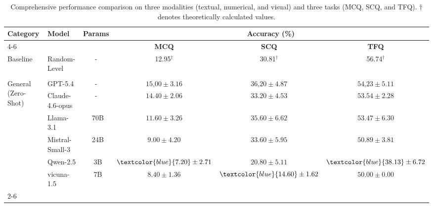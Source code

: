 \begin{table}[t]
    \centering
    \caption{Comprehensive performance comparison on three modalities (textual, numerical, and visual) and three tasks (MCQ, SCQ, and TFQ). $\dagger$ denotes theoretically calculated values. }
    \vspace{-2mm}
    \label{tab:main_results_hierarchical}
    \renewcommand{\arraystretch}{1.0} 
    \setlength{\tabcolsep}{14pt} %
    \begin{tabular}{@{} l l c c c c @{}}
        \toprule
        \multirow{2}{*}{\textbf{Category}} & \multirow{2}{*}{\textbf{Model}} & \multirow{2}{*}{\textbf{Params}} & \multicolumn{3}{c}{\textbf{Accuracy (\%)}} \\
        \cmidrule(lr){4-6} 
        & & & \textbf{MCQ} & \textbf{SCQ} & \textbf{TFQ} \\
        \midrule
        
        Baseline & Random-Level & - & 12.95$^\dagger$ & 30.81$^\dagger$ & 56.74$^\dagger$ \\
        \midrule
        
        \rowcolor{blue!10} \multicolumn{6}{c}{\textit{Textual Modality}} \\
        \midrule

        \multirow{6}{*}{General (Zero-Shot)} 
         &  GPT-5.4 \cite{singh2025openai} & - & $\underline{15.00} \pm 3.16$ & $\underline{36.20} \pm 4.87$ & $\underline{54.23} \pm 5.11$ \\
        & Claude-4.6-opus \cite{mukherjee2026red} & - & $14.40 \pm 2.06$ & $33.20 \pm 4.53$ & $53.54 \pm 2.28$ \\
        & Llama-3.1 \cite{grattafiori2024llama} & ~70B & $11.60 \pm 3.26$ & $35.60 \pm 6.62$ & $53.47 \pm 6.30$  \\
        & Mistral-Small-3 \cite{liu2026ministral} & ~24B & $9.00 \pm 4.20$ & $33.60 \pm 5.95$ & $50.89 \pm 3.81$ \\
        & Qwen-2.5 \cite{yang2025qwen3} & ~3B & $\textcolor{blue}{7.20} \pm 2.71$ & $20.80 \pm 5.11$ & $\textcolor{blue}{38.13} \pm 6.72$ \\
        & vicuna-1.5 \cite{zheng2023judging} & ~7B & $8.40 \pm 1.36$ & $\textcolor{blue}{14.60} \pm 1.62$ & $50.00 \pm 0.00$ \\
        \cmidrule(l){2-6} 
        

\end{tabular}
\end{table}
